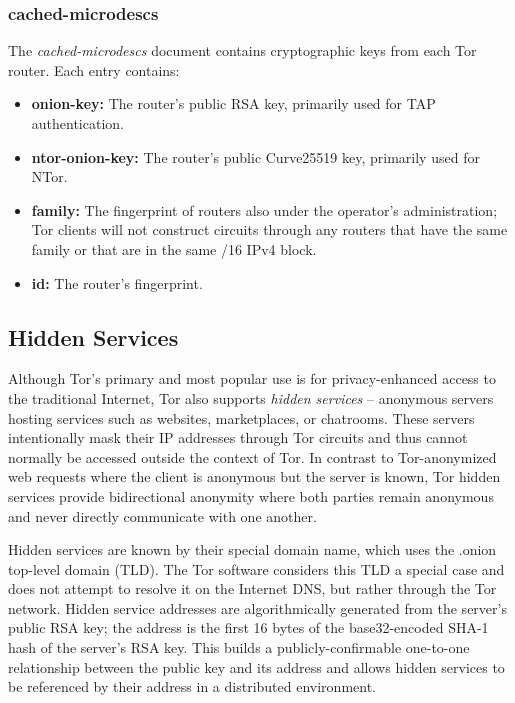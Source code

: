 \subsubsection{cached-microdescs}

The \emph{cached-microdescs} document contains cryptographic keys from each Tor router. Each entry contains:

\begin{itemize}
	\item \textbf{onion-key:} The router's public RSA key, primarily used for TAP authentication.
	\item \textbf{ntor-onion-key:} The router's public Curve25519 key, primarily used for NTor.
	\item \textbf{family:} The fingerprint of routers also under the operator's administration; Tor clients will not construct circuits through any routers that have the same family or that are in the same /16 IPv4 block.
	\item \textbf{id:} The router's fingerprint.
\end{itemize}

\newpage

\subsection{Hidden Services}
\label{sec:HiddenServices}

Although Tor's primary and most popular use is for privacy-enhanced access to the traditional Internet, Tor also supports \emph{hidden services} -- anonymous servers hosting services such as websites, marketplaces, or chatrooms. These servers intentionally mask their IP addresses through Tor circuits and thus cannot normally be accessed outside the context of Tor. In contrast to Tor-anonymized web requests where the client is anonymous but the server is known, Tor hidden services provide bidirectional anonymity where both parties remain anonymous and never directly communicate with one another.\cite{nicolussi2011human}

Hidden services are known by their special domain name, which uses the .onion top-level domain (TLD). The Tor software considers this TLD a special case and does not attempt to resolve it on the Internet DNS, but rather through the Tor network. Hidden service addresses are algorithmically generated from the server's public RSA key; the address is the first 16 bytes of the base32-encoded SHA-1 hash of the server's RSA key. This builds a publicly-confirmable one-to-one relationship between the public key and its address and allows hidden services to be referenced by their address in a distributed environment.

